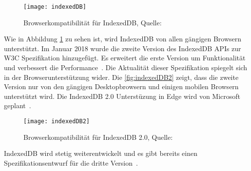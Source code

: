 \begin{figure}[H]
	\centering
	\texttt{[image: indexedDB]}
	\grayRule
	\caption[Browserkompatibilität für IndexedDB]{Browserkompatibilität für IndexedDB, Quelle: ~\cite{caniuse-idb}}
	\label{fig:indexedDB}
\end{figure}
Wie in Abbildung \ref{fig:indexedDB} zu sehen ist, wird IndexedDB von allen gängigen Browsern unterstützt. 
%
Im Januar 2018 wurde die zweite Version des IndexedDB \glspl{API} zur W3C Spezifikation hinzugefügt. Es erweitert die erste Version um Funktionalität und verbessert die Performance~\cite{idb2}.
Die Aktualität dieser Spezifikation spiegelt sich in der Browserunterstützung wider. Die \autoref{fig:indexedDB2} zeigt, dass die zweite Version nur von den gängigen Desktopbrowsern und einigen mobilen Browsern unterstützt wird. Die IndexedDB 2.0 Unterstüzung in Edge wird von Microsoft geplant~\cite{edge}.
\begin{figure}[H]
	\centering
	\texttt{[image: indexedDB2]}
	\grayRule
	\caption[Browserkompatibilität für IndexedDB 2.0]{Browserkompatibilität für IndexedDB 2.0, Quelle: ~\cite{caniuse-idb}}
	\label{fig:indexedDB2}
\end{figure}
IndexedDB wird stetig weiterentwickelt und es gibt bereits einen Spezifikationsentwurf für die dritte Version~\cite{idb3}. 